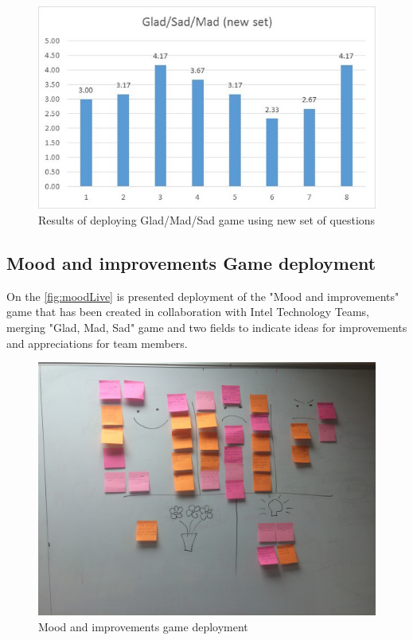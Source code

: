 \begin{figure}[!htbp]
\caption{Results of deploying Glad/Mad/Sad game using new set of questions}
\label{fig:gmsResultsNew}
\centering
\includegraphics[width=1\textwidth]{charts/gmdNewSet}
\end{figure}

\subsection{Mood and improvements Game deployment}
On the \autoref{fig:moodLive} is presented deployment of the "Mood and improvements" game that has been created in collaboration with Intel Technology Teams, merging "Glad, Mad, Sad" game and two fields to indicate ideas for improvements and appreciations for team members. 

\begin{figure}[!htbp]
\caption{Mood and improvements game deployment}
\label{fig:moodLive}
\centering
\includegraphics[width=1\textwidth]{live/moodLive}
\end{figure}

